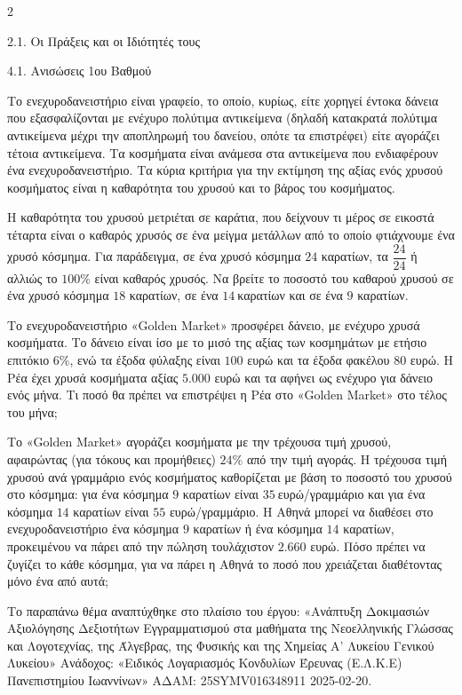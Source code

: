 \begin{ylh}{2}
    \item 2.1. Οι Πράξεις και οι Ιδιότητές τους
    \item 4.1. Ανισώσεις 1ου Βαθμού
\end{ylh}
Το ενεχυροδανειστήριο είναι γραφείο, το οποίο, κυρίως, είτε χορηγεί έντοκα δάνεια που εξασφαλίζονται με ενέχυρο πολύτιμα αντικείμενα (δηλαδή κατακρατά πολύτιμα αντικείμενα μέχρι την αποπληρωμή του δανείου, οπότε τα επιστρέφει) είτε αγοράζει τέτοια αντικείμενα. Τα κοσμήματα είναι ανάμεσα στα αντικείμενα που ενδιαφέρουν ένα ενεχυροδανειστήριο. Τα κύρια κριτήρια για την εκτίμηση της αξίας ενός χρυσού κοσμήματος είναι η καθαρότητα του χρυσού και το βάρος του κοσμήματος.

\begin{alist}
\item Η καθαρότητα του χρυσού μετριέται σε καράτια, που δείχνουν τι μέρος σε εικοστά τέταρτα είναι ο καθαρός χρυσός σε ένα μείγμα μετάλλων από το οποίο φτιάχνουμε ένα χρυσό κόσμημα. Για παράδειγμα, σε ένα χρυσό κόσμημα $24$ καρατίων, τα $\dfrac{24}{24}$ ή αλλιώς το $100\%$ είναι καθαρός χρυσός. Να βρείτε το ποσοστό του καθαρού χρυσού σε ένα χρυσό κόσμημα $18$ καρατίων, σε ένα $14\ $καρατίων και σε ένα $9$ καρατίων.
\item Το ενεχυροδανειστήριο «Golden Market» προσφέρει δάνειο, με ενέχυρο χρυσά κοσμήματα. Το δάνειο είναι ίσο με το μισό της αξίας των κοσμημάτων με ετήσιο επιτόκιο $6\%$, ενώ τα έξοδα φύλαξης είναι $100$ ευρώ και τα έξοδα φακέλου $80$ ευρώ. Η Ρέα έχει χρυσά κοσμήματα αξίας $5.000$ ευρώ και τα αφήνει ως ενέχυρο για δάνειο ενός μήνα. Τι ποσό θα πρέπει να επιστρέψει η Ρέα στο «Golden Market» στο τέλος του μήνα;
\item Το «Golden Market» αγοράζει κοσμήματα με την τρέχουσα τιμή χρυσού, αφαιρώντας (για τόκους και προμήθειες) $24\%$ από την τιμή αγοράς. Η τρέχουσα τιμή χρυσού ανά γραμμάριο ενός κοσμήματος καθορίζεται με βάση το ποσοστό του χρυσού στο κόσμημα: για ένα κόσμημα $9$ καρατίων είναι $35\ $ευρώ/γραμμάριο και για ένα κόσμημα $14$ καρατίων είναι $55$ ευρώ/γραμμάριο. Η Αθηνά μπορεί να διαθέσει στο ενεχυροδανειστήριο ένα κόσμημα $9$ καρατίων ή ένα κόσμημα $14$ καρατίων, προκειμένου να πάρει από την πώληση τουλάχιστον $2.660$ ευρώ. Πόσο πρέπει να ζυγίζει το κάθε κόσμημα, για να πάρει η Αθηνά το ποσό που χρειάζεται διαθέτοντας μόνο ένα από αυτά;

{\footnotesize Το παραπάνω θέμα αναπτύχθηκε στο πλαίσιο του έργου: «Ανάπτυξη Δοκιμασιών Αξιολόγησης Δεξιοτήτων Εγγραμματισμού στα μαθήματα της Νεοελληνικής Γλώσσας και Λογοτεχνίας, της Άλγεβρας, της Φυσικής και της Χημείας Α' Λυκείου Γενικού Λυκείου» Ανάδοχος: «Ειδικός Λογαριασμός Κονδυλίων Έρευνας (Ε.Λ.Κ.Ε) Πανεπιστημίου Ιωαννίνων» ΑΔΑΜ: 25SYMV016348911 2025-02-20.}
\end{alist}

